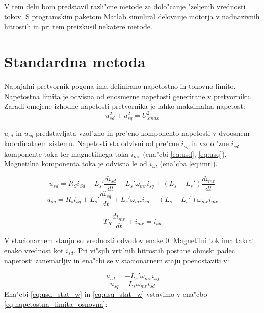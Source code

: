 \documentclass[journal,a4paper,twoside]{sty/IEEEtran}
\begin{document}
V tem delu bom predstavil razli"cne metode za dolo"canje "zeljenih vrednosti tokov.
S programskim paketom Matlab simuliral delovanje motorja v nadnazivnih hitrostih in pri tem preizkusil nekatere metode.

\section{Standardna metoda}
Napajalni pretvornik pogona ima definirano napetostno in tokovno limito. Napetostna limita je odvisna od enosmerne napetosti generirane v pretvorniku.\cite{vas}
Zaradi omejene izhodne napetosti pretvornika je lahko maksimalna napetost:
\begin{equation}
u_{sd}^2+u_{sq}^2= U_{smax}^2
\label{eq:napetostna_limita_osnovna}
\end{equation}

$u_{sd}$ in $u_{sq}$ predstavljata vzol"zno in pre"cno komponento  napetosti v dvoosnem koordinatnem sistemu. Napetosti sta odvisni od pre"cne $i_{sq}$ in vzdol"zne $i_{sd}$ komponente toka ter magnetilnega  toka $i_{mr}$ (ena"cbi \ref{eq:usd}, \ref{eq:usq}). Magnetilna komponenta toka je odvisna le od $i_{sd}$ (ena"cba \ref{eq:imr}).\cite{servopogoni}

\begin{equation}
u_{sd}= R_S i_{Sd}+L_s' \frac{di_{sd}}{dt}- L_s' \omega_{mr} i_{sq}+(L_s-L_s')\frac{di_{mr}}{dt}
\label{eq:usd}
\end{equation}
\begin{equation}
u_{sq}= R_s i_{sq}+L_s' \frac{di_{sq}}{dt} + L_s' \omega_{mr}i_{sd}+(L_s-L_s')\omega_{mr}i_{mr}
\label{eq:usq}
\end{equation}

\begin{equation}
T_R\frac{di_{mr}}{dt}+i_{mr} =i_{sd}
\label{eq:imr}
\end{equation}


V stacionarnem stanju so vrednosti odvodov enake 0. Magnetilni tok ima takrat enako vrednost kot $i_{sd}$. Pri vi"sjih vrtilnih hitrostih postane ohmski padec napetosti zanemarljiv in ena"cbi se v stacionarnem staju poenostaviti v:

\begin{equation}
u_{sd}= - L_s' \omega_{mr} i_{sq}
\label{eq:usd_stat_w}
\end{equation}
\begin{equation}
u_{sq}=  L_s \omega_{mr}i_{sd}
\label{eq:usq_stat_w}
\end{equation}
 Ena"cbi \ref{eq:usd_stat_w} in \ref{eq:usq_stat_w} vstavimo v ena"cbo \ref{eq:napetostna_limita_osnovna}:
\end{document}
